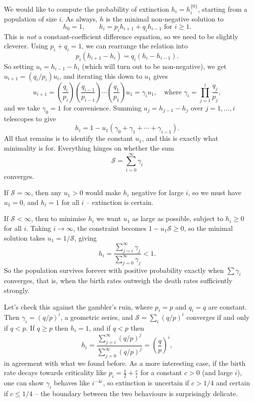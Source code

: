 \documentclass[a4paper]{scrartcl}
\begin{document}
We would like to compute the probability of extinction $h_i = h_i^{\{0\}}$, starting from a population of size $i$. As always, $h$ is the minimal non-negative solution to
$$
h_0 = 1, \qquad h_i = p_i h_{i + 1} + q_i h_{i - 1} \text{ for } i \geq 1.
$$
This is \emph{not} a constant-coefficient difference equation, so we need to be slightly cleverer. Using $p_i + q_i = 1$, we can rearrange the relation into
$$
p_i (h_{i + 1} - h_i) = q_i (h_i - h_{i - 1}).
$$
So setting $u_i = h_{i - 1} - h_i$ (which will turn out to be non-negative), we get $u_{i + 1} = (q_i/p_i) u_i$, and iterating this down to $u_1$ gives
$$
u_{i + 1} = \left(\frac{q_i}{p_i}\right)\left(\frac{q_{i - 1}}{p_{i - 1}}\right) \cdots \left(\frac{q_1}{p_1}\right) u_1 = \gamma_i u_1, \quad \text{where } \gamma_i = \prod_{j = 1}^{i} \frac{q_j}{p_j},
$$
and we take $\gamma_0 = 1$ for convenience. Summing $u_j = h_{j - 1} - h_j$ over $j = 1, \dots, i$ telescopes to give
$$
h_i = 1 - u_1(\gamma_0 + \gamma_1 + \cdots + \gamma_{i - 1}).
$$
All that remains is to identify the constant $u_1$, and this is exactly what minimality is for. Everything hinges on whether the sum
$$
	\mathcal{S} = \sum_{i = 0}^{\infty} \gamma_i
$$
converges.

If $\mathcal{S} = \infty$, then any $u_1 > 0$ would make $h_i$ negative for large $i$, so we must have $u_1 = 0$, and $h_i = 1$ for all $i$ -- extinction is certain.

If $\mathcal{S} < \infty$, then to minimise $h_i$ we want $u_1$ as large as possible, subject to $h_i \geq 0$ for all $i$. Taking $i \rightarrow \infty$, the constraint becomes $1 - u_1 \mathcal{S} \geq 0$, so the minimal solution takes $u_1 = 1/\mathcal{S}$, giving
$$
h_i = \frac{\sum_{j = i}^{\infty} \gamma_j}{\sum_{j = 0}^{\infty} \gamma_j} < 1.
$$
So the population survives forever with positive probability exactly when $\sum \gamma_i$ converges, that is, when the birth rates outweigh the death rates sufficiently strongly.

\begin{example}
	Let's check this against the gambler's ruin, where $p_i = p$ and $q_i = q$ are constant. Then $\gamma_i = (q/p)^i$, a geometric series, and $\mathcal{S} = \sum_i (q/p)^i$ converges if and only if $q < p$. If $q \geq p$ then $h_i = 1$, and if $q < p$ then
	$$
	h_i = \frac{\sum_{j = i}^{\infty}(q/p)^j}{\sum_{j = 0}^{\infty}(q/p)^j} = \left(\frac{q}{p}\right)^i,
	$$
	in agreement with what we found before. As a more interesting case, if the birth rate decays towards criticality like $p_i = \frac{1}{2} + \frac{c}{i}$ for a constant $c > 0$ (and large $i$), one can show $\gamma_i$ behaves like $i^{-4c}$, so extinction is uncertain if $c > 1/4$ and certain if $c \leq 1/4$ -- the boundary between the two behaviours is surprisingly delicate.
\end{example}
\end{document}
